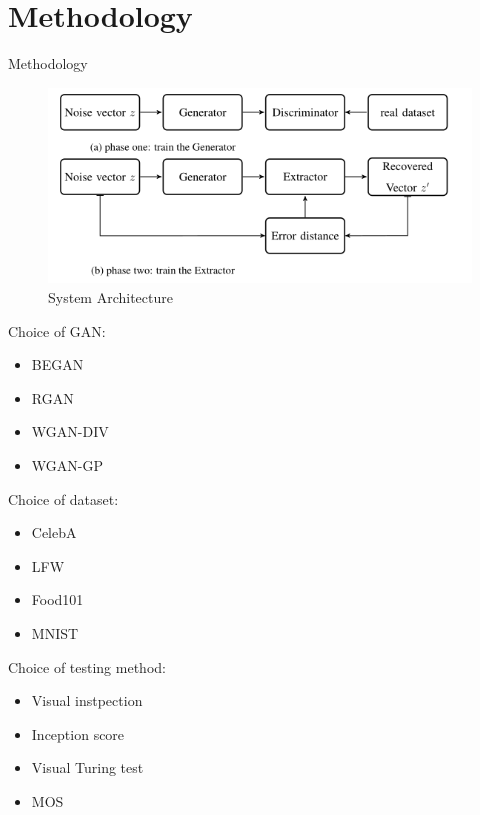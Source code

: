 \documentclass[11pt]{beamer}
\begin{document}
\section{Methodology}
\begin{frame}{Methodology} %

	\begin{figure}
		\includegraphics[scale=.45]{arch}
		\caption{System Architecture}
	\end{figure}
\end{frame}

\begin{frame} %

	Choice of GAN: 
	\begin{itemize}
		\item BEGAN
		\item RGAN
		\item WGAN-DIV
		\item WGAN-GP
	\end{itemize}
\end{frame}

\begin{frame} %

 Choice of dataset:
 \begin{itemize}
 	\item CelebA
 	\item LFW
 	\item Food101
 	\item MNIST
 \end{itemize}
\end{frame}

\begin{frame} %
	
	Choice of testing method:
	\begin{itemize}
		\item Visual instpection
		\item Inception score
		\item Visual Turing test
		\item MOS
	\end{itemize}
\end{frame}
\end{document}
